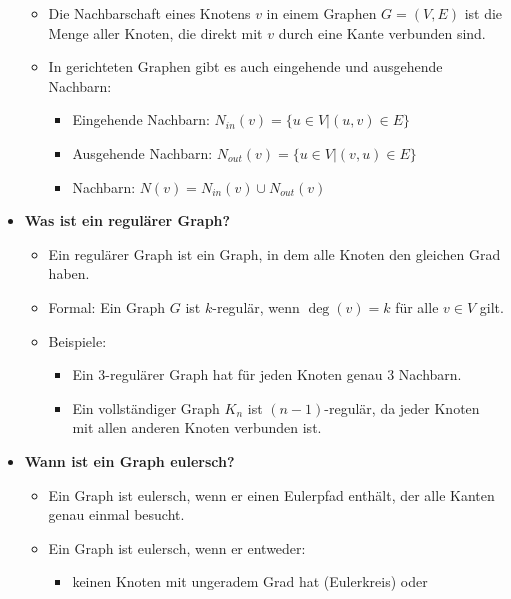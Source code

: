 \documentclass[12pt]{scrartcl}
\begin{document}
\begin{itemize}
          \begin{itemize}
              \item Die Nachbarschaft eines Knotens $v$ in einem Graphen $G = (V, E)$ ist die Menge aller Knoten, die direkt mit $v$ durch eine Kante verbunden sind.
              \item In gerichteten Graphen gibt es auch eingehende und ausgehende Nachbarn:
                    \begin{itemize}
                        \item Eingehende Nachbarn: $N_{in}(v) = \{u \in V | (u, v) \in E\}$
                        \item Ausgehende Nachbarn: $N_{out}(v) = \{u \in V | (v, u) \in E\}$
                        \item Nachbarn: $N(v) = N_{in}(v) \cup N_{out}(v)$
                    \end{itemize}
          \end{itemize}
    \item \textbf{Was ist ein regulärer Graph?}
          \begin{itemize}
              \item Ein regulärer Graph ist ein Graph, in dem alle Knoten den gleichen Grad haben.
              \item Formal: Ein Graph $G$ ist $k$-regulär, wenn $\deg(v) = k$ für alle $v \in V$ gilt.
              \item Beispiele:
                    \begin{itemize}
                        \item Ein 3-regulärer Graph hat für jeden Knoten genau 3 Nachbarn.
                        \item Ein vollständiger Graph $K_n$ ist $(n-1)$-regulär, da jeder Knoten mit allen anderen Knoten verbunden ist.
                    \end{itemize}
          \end{itemize}
          \pagebreak
    \item \textbf{Wann ist ein Graph eulersch?}
          \begin{itemize}
              \item Ein Graph ist eulersch, wenn er einen Eulerpfad enthält, der alle Kanten genau einmal besucht.
              \item Ein Graph ist eulersch, wenn er entweder:
                    \begin{itemize}
                        \item keinen Knoten mit ungeradem Grad hat (Eulerkreis) oder

\end{itemize}
\end{itemize}
\end{itemize}
\end{document}
